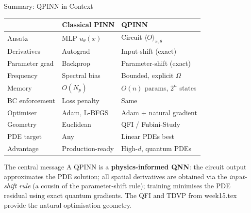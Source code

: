 \documentclass[aspectratio=169,10pt]{beamer}
\begin{document}
\begin{frame}{Summary: QPINN in Context}
  \begin{center}
  \renewcommand{\arraystretch}{1.3}
  \begin{tabular}{p{2.8cm}p{3.8cm}p{3.8cm}}
    \toprule
    & \textbf{Classical PINN} & \textbf{QPINN} \\
    \midrule
    Ansatz & MLP $u_\theta(x)$ &
             Circuit $\langle O\rangle_{x,\theta}$ \\
    Derivatives & Autograd & Input-shift (exact) \\
    Parameter grad & Backprop & Parameter-shift (exact) \\
    Frequency & Spectral bias & Bounded, explicit $\Omega$ \\
    Memory & $O(N_p)$ & $O(n)$ params, $2^n$ states \\
    BC enforcement & Loss penalty & Same \\
    Optimiser & Adam, L-BFGS & Adam + natural gradient \\
    Geometry & Euclidean & QFI / Fubini-Study \\
    PDE target & Any & Linear PDEs best \\
    Advantage & Production-ready & High-$d$, quantum PDEs \\
    \bottomrule
  \end{tabular}
  \end{center}
  \vspace{0.2cm}
  \begin{alertblock}{The central message}
    A QPINN is a \textbf{physics-informed QNN}: the circuit
    output approximates the PDE solution; all spatial
    derivatives are obtained via the \emph{input-shift rule}
    (a cousin of the parameter-shift rule); training minimises
    the PDE residual using exact quantum gradients.
    The QFI and TDVP from week15.tex provide the natural
    optimisation geometry.
  \end{alertblock}
\end{frame}
\end{document}
